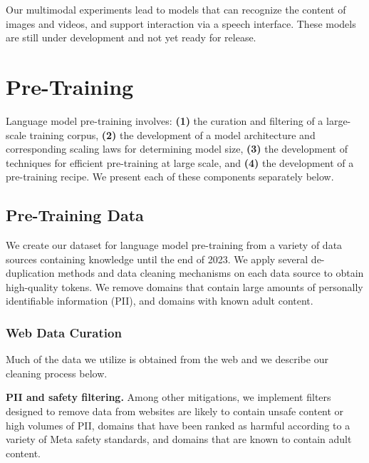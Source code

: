 \documentclass[dvipsnames]{fairmeta}
\begin{document}
Our multimodal experiments lead to models that can recognize the content of images and videos, and support interaction via a speech interface.
These models are still under development and not yet ready for release.

\section{Pre-Training}
\label{section:pretraining}

Language model pre-training involves: \textbf{(1)} the curation and filtering of a large-scale training corpus, \textbf{(2)} the development of a model architecture and corresponding scaling laws for determining model size, \textbf{(3)} the development of techniques for efficient pre-training at large scale, and \textbf{(4)} the development of a pre-training recipe. We present each of these components separately below.

\providecommand{\llama}[1]{\textsc{Llama #1}}

\subsection{Pre-Training Data}
\label{section:pretraining_data}

We create our dataset for language model pre-training from a variety of data sources containing knowledge until the end of 2023. 
We apply several de-duplication methods and data cleaning mechanisms on each data source to obtain high-quality tokens. We remove domains that contain large amounts of personally identifiable information (PII), and domains with known adult content. 

\subsubsection{Web Data Curation}
Much of the data we utilize is obtained from the web and we describe our cleaning process below. 

\textbf{PII and safety filtering.}
Among other mitigations, we implement filters designed to remove data from websites are likely to contain unsafe content or high volumes of PII, domains that have been ranked as harmful according to a variety of Meta safety standards, and domains that are known to contain adult content.
\end{document}
